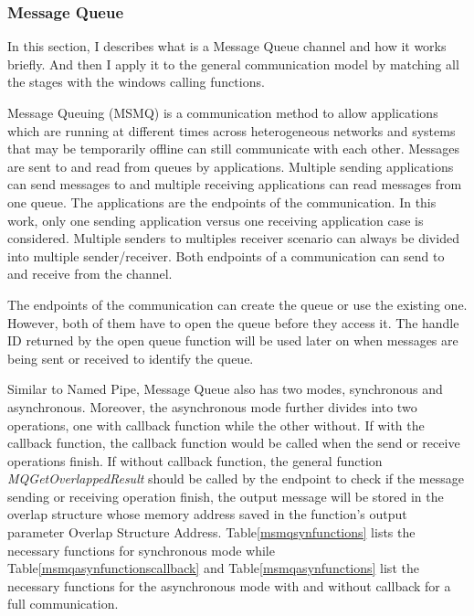 \subsubsection{Message Queue}
In this section, I describes what is a Message Queue channel and how it works briefly. And then I apply it to the general communication model by matching all the stages with the windows calling functions.

Message Queuing (MSMQ) is a communication method to allow applications which are running at different times across heterogeneous networks and systems that may be temporarily offline can still communicate with each other. Messages are sent to and read from queues by applications. Multiple sending applications can send messages to and multiple receiving applications can read messages from one queue. \cite{redkar2004pro} The applications are the endpoints of the communication. In this work, only one sending application versus one receiving application case is considered. Multiple senders to multiples receiver scenario can always be divided into multiple sender/receiver. Both endpoints of a communication can send to and receive from the channel.

The endpoints of the communication can create the queue or use the existing one. However, both of them have to open the queue before they access it. The handle ID returned by the open queue function will be used later on when messages are being sent or received to identify the queue.

Similar to Named Pipe, Message Queue also has two modes, synchronous and asynchronous. Moreover, the asynchronous mode further divides into two operations, one with callback function while the other without. If with the callback function, the callback function would be called when the send or receive operations finish. If without callback function, the general function \textit{MQGetOverlappedResult} should be called by the endpoint to check if the message sending or receiving operation finish, the output message will be stored in the overlap structure whose memory address saved in the function's output parameter Overlap Structure Address. Table\ref{msmqsynfunctions} lists the necessary functions for synchronous mode while Table\ref{msmqasynfunctionscallback} and Table\ref{msmqasynfunctions} list the necessary functions for the asynchronous mode with and without callback for a full communication. 

